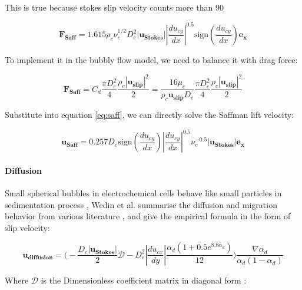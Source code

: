 This is true because stokes slip velocity counts more than 90%

\begin{equation}\label{eq:saff}
    \mathbf{ F_{Saff} } = 1.615 \rho_c \nu_c^{1/2} D_e^2 |\mathbf{u_{Stokes}}| |\frac{d u_{cy}}{d x}|^{0.5} \mathrm{sign}(\frac{d u_{cy}}{d x})\mathbf{e_x}
\end{equation}

To implement it in the bubbly flow model, we need to balance it with drag force:

\begin{equation}
    \mathbf{F_{Saff}} = C_d \frac{\pi D_e^2}{4} \frac{\rho_c |\mathbf{u_{slip}} |^2}{2} 
    = \frac{16 \mu_c }{\rho_c \mathbf{u_{slip}} D_e} \frac{\pi D_e^2}{4} \frac{\rho_c |\mathbf{u_{slip}}| ^2}{2}
\end{equation}

Substitute into equation \ref{eq:saff}, we can directly solve the Saffman lift velocity:

\begin{equation}\label{eq:Saff}
    \mathbf{u_{Saff}} = 0.257 D_e \mathrm{sign}(\frac{d u_{cy}}{d x}) |\frac{d u_{cy}}{d x}|^{0.5} \nu_c^{-0.5} |\mathbf{u_{Stokes}}| \mathbf{e_x}
\end{equation}

\paragraph{Diffusion}
\*

Small spherical bubbles in electrochemical cells behave like small particles in sedimentation process \cite{Dahlkild2001}, Wedin et al. \cite{Wetind2001} summarise the diffusion and migration behavior from various literature \cite{nicolai1995particle, schaflinger1990centrifugal, leighton1987measurement}, and give the empirical formula in the form of slip velocity:

\begin{equation}\label{eq:diffusion}
    \mathbf{ u_{diffusion} } = \big( -\frac{D_e |\mathbf{u_{Stokes}}|}{2} \mathcal{D} - D_e^2 |\frac{d u_{cx}}{d y}| \frac{\alpha_d (1 + 0.5 e^{8.8 \alpha_d})}{12} \big) \frac{\nabla \alpha_d}{\alpha_d (1 - \alpha_d)}
\end{equation}

Where $\mathcal{D}$ is the Dimensionless coefficient matrix in diagonal form \cite{nicolai1995particle}: 

